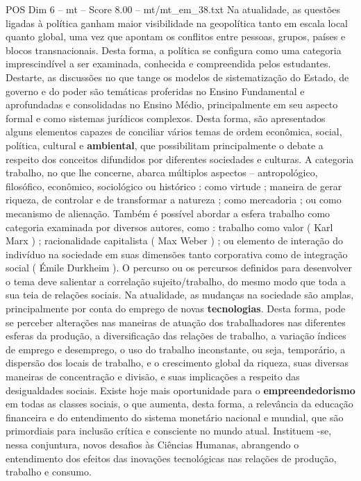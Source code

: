 \begin{textsample}{POS Dim 6 – mt – Score 8.00 – mt/mt\_em\_38.txt}
Na atualidade, as questões ligadas à política ganham maior visibilidade na geopolítica tanto em escala local quanto global, uma vez que apontam os conflitos entre pessoas, grupos, países e blocos transnacionais.
Desta forma, a política se configura como uma categoria imprescindível a ser examinada, conhecida e compreendida pelos estudantes.
Destarte, as discussões no que tange os modelos de sistematização do Estado, de governo e do poder são temáticas proferidas no Ensino Fundamental e aprofundadas e consolidadas no Ensino Médio, principalmente em seu aspecto formal e como sistemas jurídicos complexos.
Desta forma, são apresentados alguns elementos capazes de conciliar vários temas de ordem econômica, social, política, cultural e \textbf{ambiental}, que possibilitam principalmente o debate a respeito dos conceitos difundidos por diferentes sociedades e culturas.
A categoria trabalho, no que lhe concerne, abarca múltiplos aspectos – antropológico, filosófico, econômico, sociológico ou histórico : como virtude ; maneira de gerar riqueza, de controlar e de transformar a natureza ; como mercadoria ; ou como mecanismo de alienação.
Também é possível abordar a esfera trabalho como categoria examinada por diversos autores, como : trabalho como valor ( Karl Marx ) ; racionalidade capitalista ( Max Weber ) ; ou elemento de interação do indivíduo na sociedade em suas dimensões tanto corporativa como de integração social ( Émile Durkheim ).
O percurso ou os percursos definidos para desenvolver o tema deve salientar a correlação sujeito/trabalho, do mesmo modo que toda a sua teia de relações sociais.
Na atualidade, as mudanças na sociedade são amplas, principalmente por conta do emprego de novas \textbf{tecnologias}.
Desta forma, pode se perceber alterações nas maneiras de atuação dos trabalhadores nas diferentes esferas da produção, a diversificação das relações de trabalho, a variação índices de emprego e desemprego, o uso do trabalho inconstante, ou seja, temporário, a dispersão dos locais de trabalho, e o crescimento global da riqueza, suas diversas maneiras de concentração e divisão, e suas implicações a respeito das desigualdades sociais.
Existe hoje mais oportunidade para o \textbf{empreendedorismo} em todas as classes sociais, o que aumenta, desta forma, a relevância da educação financeira e do entendimento do sistema monetário nacional e mundial, que são primordiais para inclusão crítica e consciente no mundo atual.
Instituem -se, nessa conjuntura, novos desafios às Ciências Humanas, abrangendo o entendimento dos efeitos das inovações tecnológicas nas relações de produção, trabalho e consumo.

\end{textsample}
